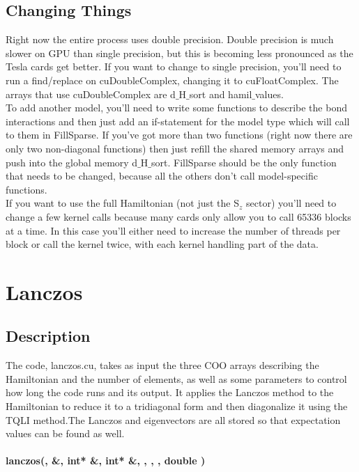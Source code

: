 \documentclass{article}
\begin{document}
{\subsection{Changing Things}
Right now the entire process uses double precision. 
Double precision is much slower on GPU than single precision, but this is becoming less pronounced as the Tesla cards get better. 
If you want to change to single precision, you'll need to run a find/replace on cuDoubleComplex, changing it to cuFloatComplex. 
The arrays that use cuDoubleComplex are d$
\_$H$\_$sort and hamil$\_$values.\\ 
To add another model, you'll need to write some functions to describe the bond interactions and then just add an if-statement for the model type which will call to them in FillSparse. 
If you've got more than two functions (right now there are only two non-diagonal functions) then just refill the shared memory arrays and push into the global memory d$\_$H$\_$sort. 
FillSparse should be the only function that needs to be changed, because all the others don't call model-specific functions.\\
If you want to use the full Hamiltonian (not just the S$_z$ sector) you'll need to change a few kernel calls because many cards only allow you to call 65336 blocks at a time. 
In this case you'll either need to increase the number of threads per block or call the kernel twice, with each kernel handling part of the data. 
 

\section{Lanczos}

\subsection{Description}
The code, lanczos.cu, takes as input the three COO arrays describing the Hamiltonian and the number of elements, as well as some parameters to control how long the code runs and its output. It applies the Lanczos method to the Hamiltonian to reduce it to a tridiagonal form and then diagonalize it using the TQLI method.The Lanczos and eigenvectors are all stored so that expectation values can be found as well.  

\paragraph{\host \void lanczos(\const \int , \const \cuDoubleComplex \&, \const int* \&, \const int* \&, \const \int , \int , \const \int , \const double )\\ \\ }

}
\end{document}

